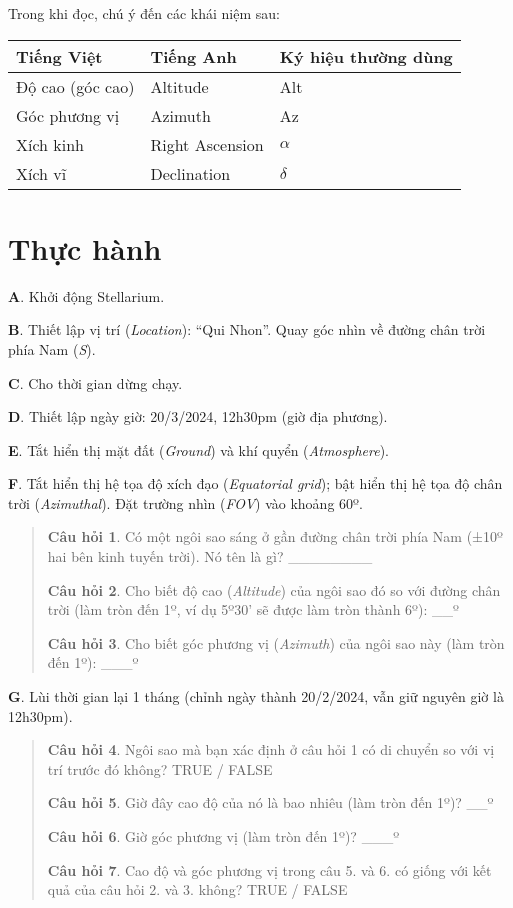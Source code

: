 \documentclass[
]{book}
\begin{document}
Trong khi đọc, chú ý đến các khái niệm sau:

\begin{longtable}[]{@{}lll@{}}
\toprule\noalign{}
Tiếng Việt & Tiếng Anh & Ký hiệu thường dùng \\
\midrule\noalign{}
\endhead
\bottomrule\noalign{}
\endlastfoot
Độ cao (góc cao) & Altitude & Alt \\
Góc phương vị & Azimuth & Az \\
Xích kinh & Right Ascension & \(\alpha\) \\
Xích vĩ & Declination & \(\delta\) \\
\end{longtable}

\section{Thực hành}\label{thux1ef1c-huxe0nh}

\textbf{A}. Khởi động Stellarium.

\textbf{B}. Thiết lập vị trí (\emph{Location}): ``Qui Nhon''. Quay góc nhìn về đường chân trời phía Nam (\emph{S}).

\textbf{C}. Cho thời gian dừng chạy.

\textbf{D}. Thiết lập ngày giờ: 20/3/2024, 12h30pm (giờ địa phương).

\textbf{E}. Tắt hiển thị mặt đất (\emph{Ground}) và khí quyển (\emph{Atmosphere}).

\textbf{F}. Tắt hiển thị hệ tọa độ xích đạo (\emph{Equatorial grid}); bật hiển thị hệ tọa độ chân trời (\emph{Azimuthal}). Đặt trường nhìn (\emph{FOV}) vào khoảng 60º.

\begin{quote}
\textbf{Câu hỏi 1}. Có một ngôi sao sáng ở gần đường chân trời phía Nam (±10º hai bên kinh tuyến trời). Nó tên là gì?
\_\_\_\_\_\_\_\_

\textbf{Câu hỏi 2}. Cho biết độ cao (\emph{Altitude}) của ngôi sao đó so với đường chân trời (làm tròn đến 1º, ví dụ 5º30' sẽ được làm tròn thành 6º):
\_\_º

\textbf{Câu hỏi 3}. Cho biết góc phương vị (\emph{Azimuth}) của ngôi sao này (làm tròn đến 1º):
\_\_\_º
\end{quote}

\textbf{G}. Lùi thời gian lại 1 tháng (chỉnh ngày thành 20/2/2024, vẫn giữ nguyên giờ là 12h30pm).

\begin{quote}
\textbf{Câu hỏi 4}. Ngôi sao mà bạn xác định ở câu hỏi 1 có di chuyển so với vị trí trước đó không?
TRUE / FALSE

\textbf{Câu hỏi 5}. Giờ đây cao độ của nó là bao nhiêu (làm tròn đến 1º)?
\_\_º

\textbf{Câu hỏi 6}. Giờ góc phương vị (làm tròn đến 1º)?
\_\_\_º

\textbf{Câu hỏi 7}. Cao độ và góc phương vị trong câu 5. và 6. có giống với kết quả của câu hỏi 2. và 3. không?
TRUE / FALSE
\end{quote}
\end{document}
